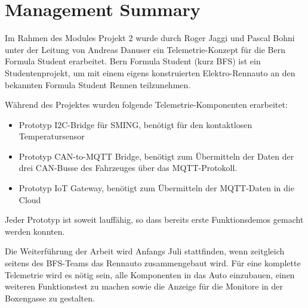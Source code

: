 \chapter*{Management Summary}
\label{chap:managementSummary}


Im Rahmen des Modules Projekt 2 wurde durch Roger Jaggi und Pascal Bohni unter der Leitung von Andreas Danuser ein Telemetrie-Konzept für die Bern Formula Student erarbeitet. Bern Formula Student (kurz BFS) ist ein Studentenprojekt, um mit einem eigens konstruierten Elektro-Rennauto an den bekannten Formula Student Rennen teilzunehmen. 

Während des Projektes wurden folgende Telemetrie-Komponenten erarbeitet:

\begin{itemize}
\itemsep1pt\parskip0pt
\item Prototyp I2C-Bridge für SMING, benötigt für den kontaktlosen Temperatursensor
\item Prototyp CAN-to-MQTT Bridge, benötigt zum Übermitteln der Daten der drei CAN-Busse des Fahrzeuges über das MQTT-Protokoll.
\item Prototyp IoT Gateway, benötigt zum Übermitteln der MQTT-Daten in die Cloud
\end{itemize}

Jeder Prototyp ist soweit lauffähig, so dass bereits erste Funktionsdemos gemacht werden konnten.

Die Weiterführung der Arbeit wird Anfangs Juli stattfinden, wenn zeitgleich seitens des BFS-Teams das Rennauto zusammengebaut wird. Für eine komplette Telemetrie wird es nötig sein, alle Komponenten in das Auto einzubauen, einen weiteren Funktionstest zu machen sowie die Anzeige für die Monitore in der Boxengasse zu gestalten.
